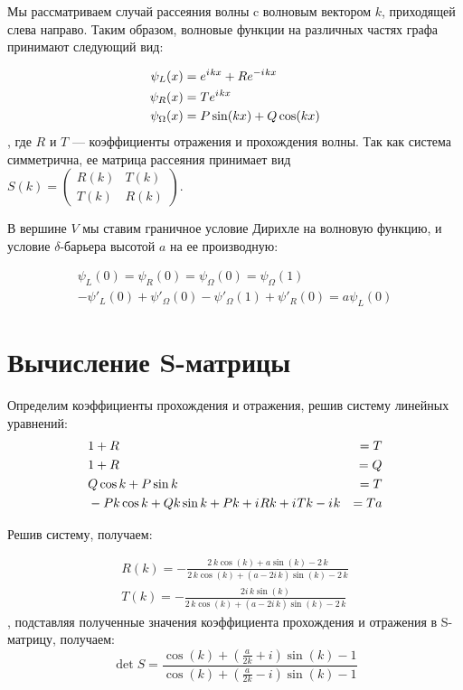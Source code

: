 \documentclass{nsart_eng}
\newcommand{\eexp}[1]{e^{#1}}
\newcommand{\iu}{{i\mkern1mu}}
\begin{document}
Мы рассматриваем случай рассеяния волны c волновым вектором $k$, приходящей слева направо. Таким образом, волновые функции на различных частях графа принимают следующий вид:

\begin{align*}
\psi_L(x) &= \eexp{\iu k x} + R \eexp{-\iu k x} \\
\psi_R(x) &= T \eexp{\iu k x}\\
\psi_\Omega(x) &= P \sin(k x) + Q \cos(k x)
\end{align*}
, где $R$ и $T$ — коэффициенты отражения и прохождения волны. Так как система симметрична, ее матрица рассеяния принимает вид
$S(k) = \begin{pmatrix} R(k) & T(k) \\ T(k) & R(k) \end{pmatrix}$.

В вершине $V$ мы ставим граничное условие Дирихле на волновую функцию, и условие $\delta$-барьера высотой $a$ на ее производную:

\begin{align*}
\psi_L(0) = \psi_R(0) = \psi_\Omega(0) = \psi_\Omega(1) \\ 
-\psi'_L(0) + \psi'_\Omega(0) - \psi'_\Omega(1) + \psi'_R(0) = a \psi_L(0)
\end{align*}


\section{Вычисление S-матрицы}
Определим коэффициенты прохождения и отражения, решив систему линейных уравнений:
\begin{align*}
& 1 + R &= T \\
& 1 + R &= Q \\
& Q \cos k + P \sin k &= T \\
& -P k \cos k + Q k \sin k + P k + \iu R k + \iu T k - \iu k &= T a
\end{align*}

Решив систему, получаем:

\begin{align*}
R(k) = -\frac{2 \, k \cos\left(k\right) + a \sin\left(k\right) - 2 \, k}{2 \, k \cos\left(k\right) + {\left(a - 2 i \, k\right)} \sin\left(k\right) - 2 \, k} \\
T(k) = -\frac{2 i \, k \sin\left(k\right)}{2 \, k \cos\left(k\right) + {\left(a - 2 i \, k\right)} \sin\left(k\right) - 2 \, k}
\end{align*}
, подставляя полученные значения коэффициента прохождения и отражения в S-матрицу, получаем:
\[
\det S = 
\frac
{\cos\left(k\right) + {\left(\frac{a}{2 k} + i\right)} \sin\left(k\right) - 1}
{\cos\left(k\right) + {\left(\frac{a}{2 k} - i\right)} \sin\left(k\right) - 1}
\]
\end{document}
